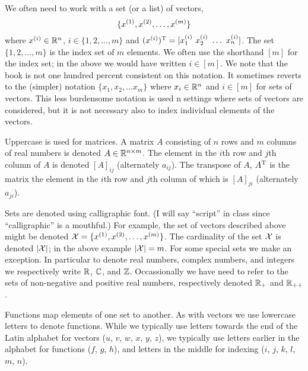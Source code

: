 We often need to work with a set (or a list) of vectors,
\begin{equation*}
\{ x^{(1)}_{}, x^{(2)}_{}, \ldots, x^{(m)}_{}\}
\end{equation*}
where $x^{(i)}_{} \in \mathbb{R}^n$, $i \in \{1, 2, \ldots, m\}$ and
$(\vecx{i})^\trans = [ \vecx[1]{i} \ \vecx[2]{i} \ \ldots \ \vecx[n]{i} ] $.  The
set $\{1, 2, \ldots, m\}$ is the index set of $m$ elements.  We often
use the shorthand $[m]$ for the index set; in the above we would have
written $i \in [m]$.  We note that the book is not one hundred percent
consistent on this notation.  It sometimes reverts to the (simpler)
notation $\{x_1, x_2, \ldots x_m\}$ where $x_i \in \mathbb{R}^n$ and $i
\in [m]$ for sets of vectors.  This less burdensome notation is used n
settings where sets of vectors are considered, but it is not necessary
also to index individual elements of the vectors.

Uppercase is used for matrices.  A matrix $A$ consisting of $n$ rows
and $m$ columns of real numbers is denoted $A \in \mathbb{R}^{n \times
  m}$.  The element in the $i$th row and $j$th column of $A$ is
denoted $[A]_{ij}$ (alternately $a_{ij}$).  The transpose of $A$,
$A^{\rm T}$ is the matrix the element in the $i$th row and $j$th
column of which is $[A]_{ji}$ (alternately $a_{ji}$).

Sets are denoted using calligraphic font.  (I will say ``script'' in
class since ``calligraphic'' is a mouthful.)  For example, the set of
vectors described above might be denoted ${\cal X} = \{ x^{(1)}_{}, x^{(2)}_{},
\ldots, x^{(m)}_{}\}$.  The cardinality of the set ${\cal X}$ is denoted $|{\cal X}|$;
in the above example $|{\cal X}| = m$.  For some special sets we make an
exception.  In particular to denote real numbers, complex numbers, and
integers we respectively write $\mathbb{R}$, $\mathbb{C}$, and $\mathbb{Z}$.
Occassionally we have need to refer to the sets of non-negative and
positive real numbers, respectively denoted $\mathbb{R}_+$ and
$\mathbb{R}_{++}$.

Functions map elements of one set to another.  As with vectors we use
lowercase letters to denote functions.  While we typically use letters
towards the end of the Latin alphabet for vectors ($u$, $v$, $w$, $x$,
$y$, $z$), we typically use letters earlier in the alphabet for
functions ($f$, $g$, $h$), and letters in the middle for indexing
($i$, $j$, $k$, $l$, $m$, $n$).  


